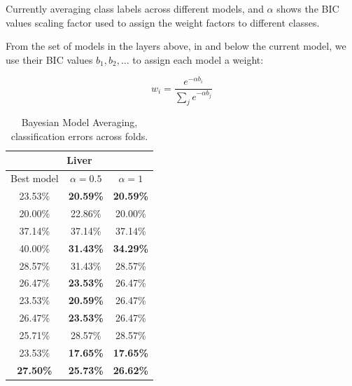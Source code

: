\documentclass[a4paper,12pt ]{report}
\begin{document}
Currently averaging class labels across different models, and $\alpha$ shows the BIC values scaling factor used to assign the weight factors to different classes. 

From the set of models in the layers above, in and below the current model, we use their BIC values $b_1, b_2, \ldots $ to assign each model a weight:

\begin{equation*} w_i = \frac{e^{- \alpha b_i}}{ \sum_{j}{ e^{- \alpha b_j} } }  \end{equation*}

\begin{table}[h]

\caption{{ Bayesian Model Averaging, classification errors across folds.  }}

\label{tbl:BMAliver}

\begin{minipage}{0.55\textwidth}
      \centering
      \begin{tabular}{|c | c | c | }
      \hline
      \multicolumn{3}{|c|}{Liver}  \\
      \hline
      Best model & $ \alpha = 0.5 $ & $ \alpha = 1 $ \\  \hline
      23.53\% & \textbf{20.59\%} & \textbf{20.59\% } \\ 
      20.00\%	& 22.86\% &20.00\% \\ 
      37.14\%	& 37.14\% &37.14\%\\ 
      40.00\%	& \textbf{31.43\%} & \textbf{34.29\%}  \\ 
      28.57\%	& 31.43\% & 28.57\% \\ 
      26.47\%	& \textbf{23.53\%} & 26.47\% \\ 
      23.53\%	& \textbf{20.59\%} &26.47\%\\ 
      26.47\%	& \textbf{23.53\%} &26.47\%\\ 
      25.71\%	& 28.57\% &28.57\% \\ 
      23.53\%	& \textbf{17.65\%} & \textbf{17.65\%} \\ \hline \hline
       \textbf{27.50\%}	&  \textbf{25.73\%} &  \textbf{26.62\%} \\ 
      \hline 
      \end{tabular}


\end{minipage}
\end{table}
\end{document}
